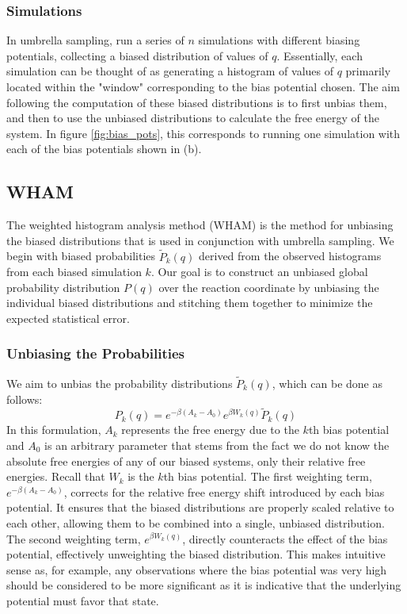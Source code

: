 \documentclass{article}
\begin{document}
\subsubsection{Simulations}
In umbrella sampling, run a series of $n$ simulations with different biasing potentials, collecting a biased distribution of values of $q$.
Essentially, each simulation can be thought of as generating a histogram of values of $q$ primarily located within the "window" corresponding to the bias potential chosen.
The aim following the computation of these biased distributions is to first unbias them, and then to use the unbiased distributions to calculate the free energy of the system.
In figure \ref{fig:bias_pots}, this corresponds to running one simulation with each of the bias potentials shown in (b).

\subsection{WHAM}
The weighted histogram analysis method (WHAM) is the method for unbiasing the biased distributions that is used in conjunction with umbrella sampling.
We begin with biased probabilities $\tilde{P}_k(q)$ derived from the observed histograms from each biased simulation $k$.
Our goal is to construct an unbiased global probability distribution $P(q)$ over the reaction coordinate by unbiasing the individual biased distributions and stitching them together to minimize the expected statistical error.

\subsubsection{Unbiasing the Probabilities}
We aim to unbias the probability distributions $\tilde{P}_k(q)$, which can be done as follows:
$$ P_k(q) = e^{-\beta(A_k - A_0)} e^{\beta W_k(q)} \tilde{P}_k(q) $$
In this formulation, $A_k$ represents the free energy due to the $k$th bias potential and $A_0$ is an arbitrary parameter that stems from the fact we do not know the absolute free energies of any of our biased systems, only their relative free energies.
Recall that $W_k$ is the $k$th bias potential.
The first weighting term, $e^{-\beta(A_k - A_0)}$, corrects for the relative free energy shift introduced by each bias potential. It ensures that the biased distributions are properly scaled relative to each other, allowing them to be combined into a single, unbiased distribution.
The second weighting term, $e^{\beta W_k(q)}$, directly counteracts the effect of the bias potential, effectively unweighting the biased distribution. This makes intuitive sense as, for example, any observations where the bias potential was very high should be considered to be more significant as it is indicative that the underlying potential must favor that state.
\end{document}
